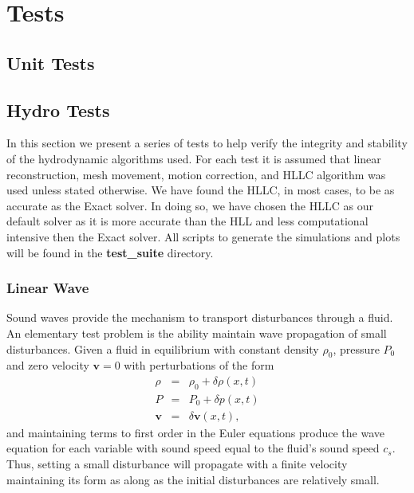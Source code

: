 \section{Tests}
\subsection{Unit Tests}

\subsection{Hydro Tests}
In this section we present a series of tests to help verify the integrity and stability
of the hydrodynamic algorithms used. For each test it is assumed that linear reconstruction,
mesh movement, motion correction, and HLLC algorithm was used unless stated otherwise. We
have found the HLLC, in most cases, to be as accurate as the Exact solver. In doing so, we have 
chosen the HLLC as our default solver as it is more accurate than the HLL and less computational 
intensive then the Exact solver. All scripts to generate the simulations and plots will be found
in the \textbf{test\_suite} directory.

\subsubsection{Linear Wave}
Sound waves provide the mechanism to transport disturbances through a fluid. An
elementary test problem is the ability maintain wave propagation of small
disturbances. Given a fluid in equilibrium with constant density $\rho_0$,
pressure $P_0$ and zero velocity $\mathbf{v}=0$ with perturbations of the form
\begin{equation}
	\begin{array}{rcl}
		\rho & = & \rho_0 + \delta\rho(x,t) \\
   		 P & = & P_0 + \delta p(x,t) \\
    	\mathbf{v} & = & \delta\mathbf{v}(x,t),
    \end{array}
\end{equation}
and maintaining terms to first order in the Euler equations produce the wave
equation for each variable with sound speed equal to the fluid's sound speed 
$c_s$. Thus, setting a small disturbance 
will propagate with a finite velocity maintaining its form as along as the initial
disturbances are relatively small.

